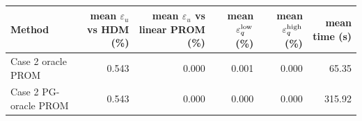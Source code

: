 \begin{tabular}{lrrrrr}
\toprule
Method & mean $\varepsilon_u$ vs HDM (\%) & mean $\varepsilon_u$ vs linear PROM (\%) & mean $\varepsilon_q^{\rm low}$ (\%) & mean $\varepsilon_q^{\rm high}$ (\%) & mean time (s) \\
\midrule
Case 2 oracle PROM & 0.543 & 0.000 & 0.001 & 0.000 & 65.35 \\
Case 2 PG-oracle PROM & 0.543 & 0.000 & 0.000 & 0.000 & 315.92 \\
\bottomrule
\end{tabular}
